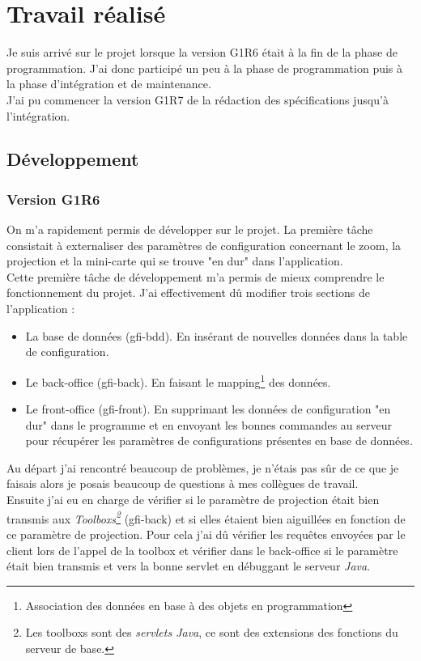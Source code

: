 \chapter{Travail réalisé}
Je suis arrivé sur le projet lorsque la version G1R6 était à la fin de la phase de programmation. J'ai donc participé un peu à la phase de programmation puis à la phase d'intégration et de maintenance.
\\J'ai pu commencer la version G1R7 de la rédaction des spécifications jusqu'à l'intégration.
\section{Développement}
\subsection{Version G1R6}
On m'a rapidement permis de développer sur le projet. La première tâche consistait à externaliser des paramètres de configuration concernant le zoom, la projection et la mini-carte qui se trouve "en dur" dans l'application.
\\Cette première tâche de développement m'a permis de mieux comprendre le fonctionnement du projet. J'ai effectivement dû modifier trois sections de l'application :\\
\begin{itemize}
\item La base de données (gfi-bdd). En insérant de nouvelles données dans la table de configuration.
\item Le back-office (gfi-back). En faisant le mapping\footnote{Association des données en base à des objets en programmation} des données.
\item Le front-office (gfi-front). En supprimant les données de configuration "en dur" dans le programme et en envoyant les bonnes commandes au serveur pour récupérer les paramètres de configurations présentes en base de données.\\
\end{itemize}
Au départ j'ai rencontré beaucoup de problèmes, je n'étais pas sûr de ce que je faisais alors je posais beaucoup de questions à mes collègues de travail.
\\ Ensuite j'ai eu en charge de vérifier si le paramètre de projection était bien transmis aux  \textit{Toolboxs\footnote{Les toolboxs sont des \textit{servlets Java}, ce sont des extensions des fonctions du serveur de base.}} (gfi-back) et si elles étaient bien aiguillées en fonction de ce paramètre de projection.
Pour cela j'ai dû vérifier les requêtes envoyées par le client lors de l'appel de la toolbox et vérifier dans le back-office si le paramètre était bien transmis et vers la bonne servlet en débuggant le serveur \textit{Java}.


